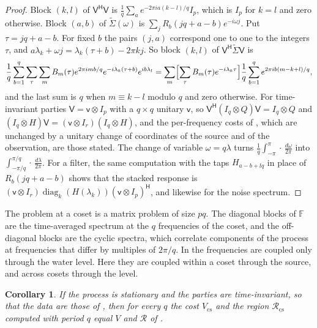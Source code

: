 \documentclass[11pt,onecolumn]{IEEEtran}
\newtheorem{corollary}[theorem]{Corollary}
\newcommand{\dw}{\tfrac{d\omega}{2\pi}}
\newcommand{\dl}{\tfrac{d\lambda}{2\pi}}
\newcommand{\herm}{\mathsf H}
\newcommand{\tS}{\tilde\Sigma}
\newcommand{\cF}{\mathbb F}
\begin{document}
\begin{proof}
Block $(k,l)$ of $\mathsf V^{\herm}\mathsf V$ is
$\tfrac1q\sum_ae^{-2\pi ia(k-l)/q}I_p$, which is $I_p$ for $k=l$ and zero
otherwise. Block $(a,b)$ of $\tS(\omega)$ is
$\sum_jR_b(jq+a-b)e^{-i\omega j}$. Put $\tau=jq+a-b$. For fixed $b$ the
pairs $(j,a)$ correspond one to one to the integers $\tau$, and
$a\lambda_k+\omega j=\lambda_k(\tau+b)-2\pi kj$. So block $(k,l)$ of
$\mathsf V^{\herm}\tS\mathsf V$ is
\[
\frac1q\sum_{b=1}^q\sum_\tau\sum_mB_m(\tau)e^{2\pi imb/q}e^{-i\lambda_k(\tau+b)}e^{ib\lambda_l}
=\sum_m\Bigl[\sum_\tau B_m(\tau)e^{-i\lambda_k\tau}\Bigr]\frac1q\sum_{b=1}^qe^{2\pi ib(m-k+l)/q},
\]
and the last sum is $q$ when $m\equiv k-l$ modulo $q$ and zero
otherwise. For time-invariant parties
$\mathsf V=\mathsf v\otimes I_p$ with a $q\times q$ unitary $\mathsf v$,
so $\mathsf V^{\herm}(I_q\otimes Q)\mathsf V=I_q\otimes Q$ and
$(I_q\otimes H)\mathsf V=(\mathsf v\otimes I_r)(I_q\otimes H)$, and the
per-frequency costs of \cite{part2}, which are unchanged by a unitary
change of coordinates of the source and of the observation, are those
stated. The change of variable $\omega=q\lambda$ turns
$\tfrac1q\int_{-\pi}^{\pi}\cdot\,\dw$ into
$\int_{-\pi/q}^{\pi/q}\cdot\,\dl$. For a filter, the same computation with
the taps $H_{a-b+lq}$ in place of $R_b(jq+a-b)$ shows that the stacked
response is
$(\mathsf v\otimes I_r)\operatorname{diag}_k(H(\lambda_k))(\mathsf v\otimes I_p)^{\herm}$,
and likewise for the noise spectrum.
\end{proof}

The problem at a coset is a matrix problem of size $pq$. The diagonal
blocks of $\cF$ are the time-averaged spectrum at the $q$ frequencies
of the coset, and the off-diagonal blocks are the cyclic spectra,
which correlate components of the process at frequencies that differ
by multiples of $2\pi/q$. In \cite{part2} the frequencies are coupled
only through the water level. Here they are coupled within a coset
through the source, and across cosets through the level.

\begin{corollary}\label{cor:blocking}
If the process is stationary and the parties are time-invariant, so
that the data are those of \cite{part2}, then for every $q$ the cost
$V_{\mathrm{cs}}$ and the region $\mathcal R_{\mathrm{cs}}$ computed
with period $q$ equal $V$ and $\mathcal R$ of \cite{part2}.
\end{corollary}
\end{document}
